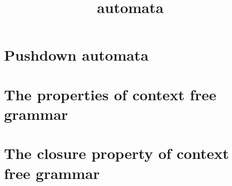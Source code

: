 \documentclass[12pt]{book}
\theoremstyle{definition}
\theoremstyle{remark}
\begin{document}
\title{automata}
\maketitle
\tableofcontents
\chapter{Pushdown automata}

\chapter{The properties of context free grammar}

\chapter{The closure property of context free grammar}

\end{document}
